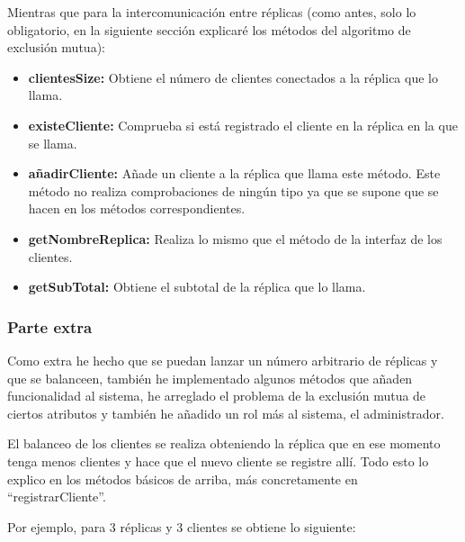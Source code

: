 \documentclass{article}
\begin{document}
\newpage

Mientras que para la intercomunicación entre réplicas (como antes, solo lo obligatorio, en la siguiente sección explicaré los métodos del algoritmo de exclusión mutua):

\begin{itemize}
    \item \textbf{clientesSize: }Obtiene el número de clientes conectados a la réplica que lo llama.
    \item \textbf{existeCliente: }Comprueba si está registrado el cliente en la réplica en la que se llama.
    \item \textbf{añadirCliente: }Añade un cliente a la réplica que llama este método. Este método no realiza comprobaciones de ningún tipo ya que se supone que se hacen en los métodos correspondientes.
    \item \textbf{getNombreReplica: }Realiza lo mismo que el método de la interfaz de los clientes.
    \item \textbf{getSubTotal: }Obtiene el subtotal de la réplica que lo llama.
\end{itemize}

\subsubsection{Parte extra}
Como extra he hecho que se puedan lanzar un número arbitrario de réplicas y que se balanceen, también he implementado algunos métodos que añaden funcionalidad al sistema, he arreglado el problema de la exclusión mutua de ciertos atributos y también he añadido un rol más al sistema, el administrador. 

El balanceo de los clientes se realiza obteniendo la réplica que en ese momento tenga menos clientes y hace que el nuevo cliente se registre allí. Todo esto lo explico en los métodos básicos de arriba, más concretamente en ``registrarCliente''.

\bigskip

Por ejemplo, para 3 réplicas y 3 clientes se obtiene lo siguiente:
\end{document}
